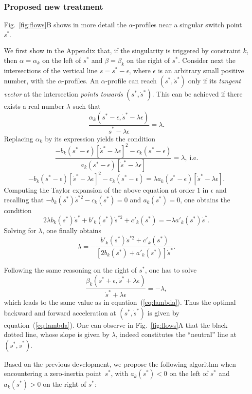 \documentclass[9pt,technote]{IEEEtran}
\begin{document}
\subsubsection{Proposed new treatment}

Fig.~\ref{fig:flows}B shows in more detail the $\alpha$-profiles near
a singular switch point $s^*$. 

We first show in the Appendix that, if the singularity is triggered by
constraint $k$, then $\alpha=\alpha_k$ on the left of $s^*$ and
$\beta=\beta_k$ on the right of $s^*$. Consider next the intersections
of the vertical line $s=s^*-\epsilon$, where $\epsilon$ is an
arbitrary small positive number, with the $\alpha$-profiles. An
$\alpha$-profile can reach $(s^*,\dot s^*)$ only if its \emph{tangent
  vector} at the intersection \emph{points towards} $(s^*,\dot
s^*)$. This can be achieved if there exists a real number $\lambda$
such that
\[
\frac{\alpha_k(s^*-\epsilon,\dot s^*-\lambda\epsilon)}{\dot s^*-\lambda\epsilon}=\lambda.
\]
Replacing $\alpha_k$ by its expression yields the condition
\[
\frac{-b_k(s^*-\epsilon)[\dot
  s^*-\lambda\epsilon]^2-c_k(s^*-\epsilon)}{a_k(s^*-\epsilon)[\dot
  s^*-\lambda\epsilon]}=\lambda,\ \textrm{i.e.
}
\]
\[
-b_k(s^*-\epsilon)[\dot
  s^*-\lambda\epsilon]^2-c_k(s^*-\epsilon)=\lambda a_k(s^*-\epsilon)[\dot s^*-\lambda\epsilon].
  \]
%
Computing the Taylor expansion of the above equation at order 1 in
$\epsilon$ and recalling that $-b_k(s^*)\dot
s^{*2}-c_k(s^*)=0$ and $a_k(s^*)=0$, one obtains the condition
%
\[
2\lambda b_k(s^*)\dot s^* + b'_k(s^*)\dot{s}^{*2}+
c'_k(s^*)=-\lambda  a'_k(s^*) \dot s^*.
\]
%
Solving for $\lambda$, one finally obtains
\begin{equation}
  \label{eq:lambda}
  \lambda=-\frac{b'_k(s^*)\dot{s}^{*2}+c'_k(s^*)}{[2
    b_k(s^*) +a'_k(s^*)]\dot s^*}.
\end{equation}

Following the same reasoning on the right of $s^*$, one has to solve
\[
\frac{\beta_k(s^*+\epsilon,\dot s^*+\lambda\epsilon)}{\dot s^*+\lambda\epsilon}=-\lambda,
\]
which leads to the same value as in equation~(\ref{eq:lambda}). Thus
the optimal backward and forward acceleration at $(s^*,\dot s^*)$ is
given by equation~(\ref{eq:lambda}). One can observe in
Fig.~\ref{fig:flows}A that the black dotted line, whose slope is given
by $\lambda$, indeed constitutes the ``neutral'' line at $(s^*,\dot
s^*)$.

Based on the previous development, we propose the following algorithm
when encountering a zero-inertia point~$s^*$, with $a_k(s^*)<0$ on the
left of $s^*$ and $a_k(s^*)>0$ on the right of $s^*$:
\end{document}

